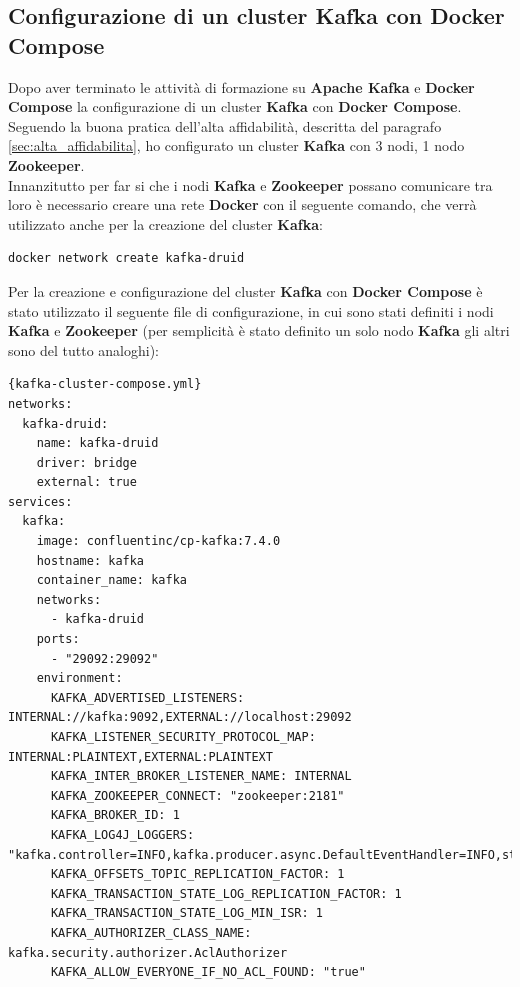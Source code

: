 \subsection{Configurazione di un cluster Kafka con Docker Compose}
Dopo aver terminato le attività di formazione su \textbf{Apache Kafka} e \textbf{Docker Compose} 
la configurazione di un \gls{cluster}{} \textbf{Kafka} con \textbf{Docker Compose}. 
\\Seguendo la buona pratica dell'alta affidabilità, descritta del 
paragrafo \ref{sec:alta_affidabilita}, ho configurato un \gls{cluster}{} \textbf{Kafka} con 3 nodi, 1 nodo \textbf{Zookeeper}.\\
Innanzitutto per far si che i nodi \textbf{Kafka} e \textbf{Zookeeper} possano comunicare tra loro è necessario creare una rete 
\textbf{Docker} con il seguente comando, che verrà utilizzato anche per la creazione del \gls{cluster}{} \textbf{Kafka}:
\begin{lstlisting}[language=bash]
    docker network create kafka-druid
\end{lstlisting}
Per la creazione e configurazione del \gls{cluster}{} \textbf{Kafka} con \textbf{Docker Compose} è stato utilizzato il seguente file di 
configurazione, in cui sono stati definiti i nodi \textbf{Kafka} e \textbf{Zookeeper} (per semplicità è stato definito un solo nodo \textbf{Kafka} gli altri sono del tutto analoghi):
\begin{lstlisting}[caption=\texttt{kafka-cluster-compose.yml}, label=lst:file]{kafka-cluster-compose.yml}
networks:
  kafka-druid:
    name: kafka-druid
    driver: bridge
    external: true
services:
  kafka:
    image: confluentinc/cp-kafka:7.4.0
    hostname: kafka
    container_name: kafka
    networks:
      - kafka-druid
    ports:
      - "29092:29092"
    environment:
      KAFKA_ADVERTISED_LISTENERS: INTERNAL://kafka:9092,EXTERNAL://localhost:29092
      KAFKA_LISTENER_SECURITY_PROTOCOL_MAP: INTERNAL:PLAINTEXT,EXTERNAL:PLAINTEXT
      KAFKA_INTER_BROKER_LISTENER_NAME: INTERNAL
      KAFKA_ZOOKEEPER_CONNECT: "zookeeper:2181"
      KAFKA_BROKER_ID: 1
      KAFKA_LOG4J_LOGGERS: "kafka.controller=INFO,kafka.producer.async.DefaultEventHandler=INFO,state.change.logger=INFO"
      KAFKA_OFFSETS_TOPIC_REPLICATION_FACTOR: 1
      KAFKA_TRANSACTION_STATE_LOG_REPLICATION_FACTOR: 1
      KAFKA_TRANSACTION_STATE_LOG_MIN_ISR: 1
      KAFKA_AUTHORIZER_CLASS_NAME: kafka.security.authorizer.AclAuthorizer
      KAFKA_ALLOW_EVERYONE_IF_NO_ACL_FOUND: "true"

\end{lstlisting}
